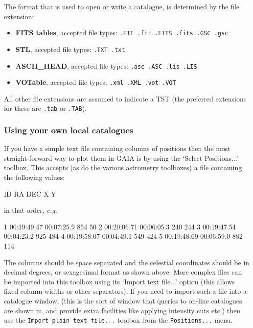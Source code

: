 \documentclass[twoside,11pt,nolof]{starlink}
\providecommand{\mytt}[1]{{\texttt{#1}}}
\providecommand{\mybold}[1]{{\textbf{#1}}}
\begin{document}
The format that is used to open or write a catalogue, is determined by
the file extension:
\begin{itemize}
\item \mybold{FITS tables}, accepted file types: \mytt{.FIT .fit .FITS .fits .GSC .gsc}
\item \mybold{STL}, accepted file types: \mytt{.TXT .txt}
\item \mybold{ASCII\_HEAD}, accepted file types: \mytt{.asc .ASC .lis .LIS}
\item \mybold{VOTable}, accepted file types: \mytt{.xml .XML .vot .VOT}
\end{itemize}
All other file extensions are assumed to indicate a TST (the preferred
extensions for these are \mytt{.tab} or \mytt{.TAB}).

\subsubsection{Using your own local catalogues}
If you have a simple text file containing columns of positions then
the most straight-forward way to plot them in GAIA is by using the
`Select Positions...' toolbox. This accepts (as do the various
astrometry toolboxes) a file containing the following values:
\begin{terminalv}
ID  RA  DEC  X  Y
\end{terminalv}
in that order, \textit{e.g.}
\begin{terminalv}
1   00:19:49.47   00:07:25.9   854    50
2   00:20:06.71   00:06:05.3   240   244
3   00:19:47.54   00:04:23.2   925   484
4   00:19:58.07   00:04:49.1   549   424
5   00:19:48.69   00:06:59.0   882   114
\end{terminalv}
The columns should be space separated and the celestial coordinates
should be in decimal degrees, or sexagesimal format as shown above. More
complex files can be imported into this toolbox using its `Import text
file...'  option (this allows fixed column widths or other
separators). If you need to import such a file into a catalogue window,
(this is the sort of window that queries to on-line catalogues are shown
in, and provide extra facilities like applying intensity cuts etc.) then
use the
\mytt{Import plain text file...} toolbox from the \mytt{Positions...} menu.
\end{document}
